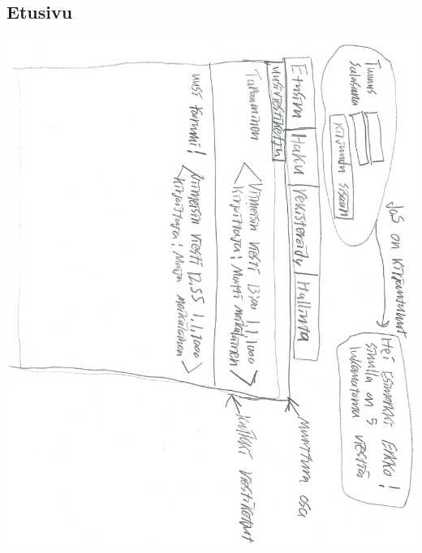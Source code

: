 \documentclass[a4paper, 12pt, finnish]{article}
\begin{document}
\subsection{Etusivu}
\includegraphics[width=\textwidth,height=\textheight,keepaspectratio]{etusivu.png}
\end{document}
